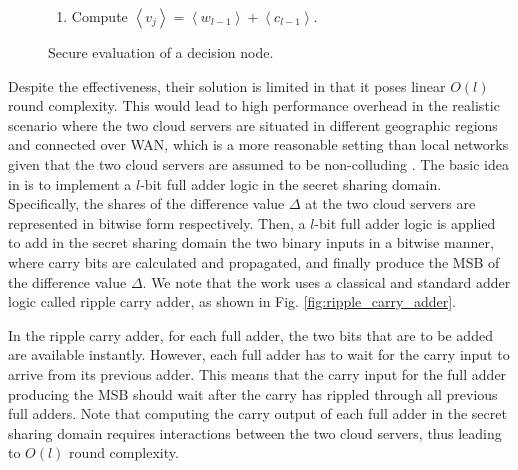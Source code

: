 \documentclass[10pt,journal,compsoc]{IEEEtran}
\begin{document}
\begin{figure*}[!t]
{\begin{minipage} [t]{0.85\textwidth}
\begin{enumerate}[1:]
\item Compute $\left\langle{v_j}\right\rangle=\left\langle{w_{l-1}}\right\rangle+ \left\langle{c_{l-1}} \right\rangle$. 



\end{enumerate}
\end{minipage}
}

%
\caption{Secure evaluation of a decision node.}
\label{fig:secure-decision-node-evaluation}
\end{figure*}




Despite the effectiveness, their solution is limited in that it poses linear $O(l)$ round complexity.
%
This would lead to high performance overhead in the realistic scenario where the two cloud servers are situated in different geographic regions and connected over WAN, which is a more reasonable setting than local networks given that the two cloud servers are assumed to be non-colluding \cite{ChenPopa20}.
%
The basic idea in \cite{ZhengDWWN20} is to implement a $l$-bit full adder logic in the secret sharing domain.
%
%
Specifically, the shares of the difference value $\Delta$ at the two cloud servers are represented in bitwise form respectively.
%
Then, a $l$-bit full adder logic is applied to add in the secret sharing domain the two binary inputs in a bitwise manner, where carry bits are calculated and propagated, and finally produce the MSB of the difference value $\Delta$.
%
We note that the work \cite{ZhengDWWN20} uses a classical and standard adder logic called ripple carry adder, as shown in Fig. \ref{fig:ripple_carry_adder}.
%


In the ripple carry adder, for each full adder, the two bits that are to be added are available instantly. 
%
However, each full adder has to wait for the carry input to arrive from its previous adder.
%
This means that the carry input for the full adder producing the MSB should wait after the carry has rippled through all previous full adders.
%
Note that computing the carry output of each full adder in the secret sharing domain requires interactions between the two cloud servers, thus leading to $O(l)$ round complexity.
\end{document}
